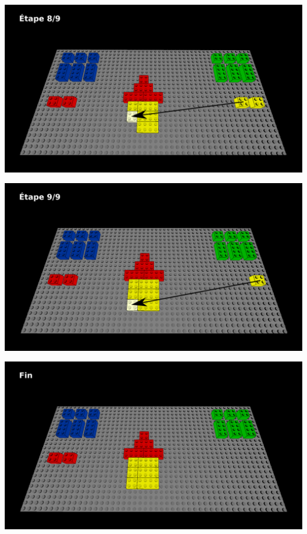 \documentclass[aspectratio=169]{beamer}
\begin{document}
\begin{frame}
  \includegraphics[width=\linewidth]{step8.png}
\end{frame}

\begin{frame}
  \includegraphics[width=\linewidth]{step9.png}
\end{frame}

\begin{frame}
  \includegraphics[width=\linewidth]{end.png}
\end{frame}
\end{document}
